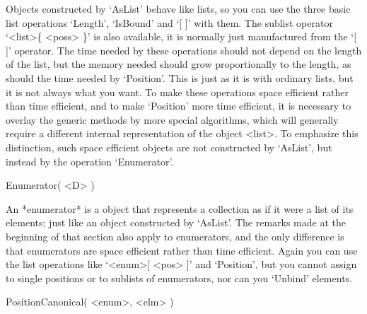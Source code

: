 Objects constructed by  `AsList' behave like lists, so   you can use  the
three basic list operations `Length', `IsBound' and `[  ]' with them. The
sublist operator `<list>\{ <poss>  \}' is also  available, it is normally
just  manufactured from the  `[  ]' operator.  The  time needed  by these
operations  should not depend on  the length of the  list, but the memory
needed should grow proportionally  to   the length,  as should  the  time
needed by `Position'. This  is just as it is  with ordinary lists, but it
is not always  what you want. To   make these operations  space efficient
rather  than time efficient, and to  make `Position' more time efficient,
it  is  necessary    to overlay the  generic   methods   by  more special
algorithms,  which    will  generally   require   a   different  internal
representation of the object  <list>. To emphasize this distinction, such
space  efficient objects are not  constructed by `AsList', but instead by
the operation `Enumerator'.

\>Enumerator( <D> )

An *enumerator* is a {\GAP} object that represents  a collection as if it
were a list of its elements; just like an object constructed by `AsList'.
The  remarks  made  at  the  beginning  of  that  section   also apply to
enumerators,  and the only    difference is  that enumerators  are  space
efficient  rather than  time    efficient. Again  you can  use   the list
operations like `<enum>[ <pos> ]'  and `Position', but you cannot  assign
to single positions or  to sublists of enumerators,  nor can you `Unbind'
elements.

\>PositionCanonical( <enum>, <elm> )

